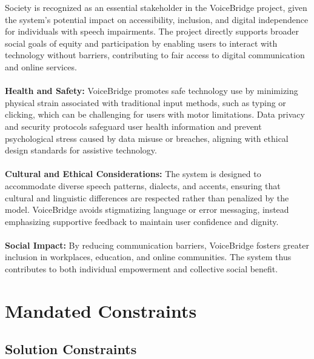 \documentclass[11pt]{article}
\begin{document}
Society is recognized as an essential stakeholder in the VoiceBridge project, given the system’s potential impact on accessibility, inclusion, and digital independence for individuals with speech impairments. The project directly supports broader social goals of equity and participation by enabling users to interact with technology without barriers, contributing to fair access to digital communication and online services.
\\\\
\textbf{Health and Safety:} 
VoiceBridge promotes safe technology use by minimizing physical strain associated with traditional input methods, such as typing or clicking, which can be challenging for users with motor limitations. Data privacy and security protocols safeguard user health information and prevent psychological stress caused by data misuse or breaches, aligning with ethical design standards for assistive technology.
\\\\
\textbf{Cultural and Ethical Considerations:} 
The system is designed to accommodate diverse speech patterns, dialects, and accents, ensuring that cultural and linguistic differences are respected rather than penalized by the model. VoiceBridge avoids stigmatizing language or error messaging, instead emphasizing supportive feedback to maintain user confidence and dignity.
\\\\
\textbf{Social Impact:} 
By reducing communication barriers, VoiceBridge fosters greater inclusion in workplaces, education, and online communities. The system thus contributes to both individual empowerment and collective social benefit.


\section{Mandated Constraints}
\subsection{Solution Constraints}
\end{document}

